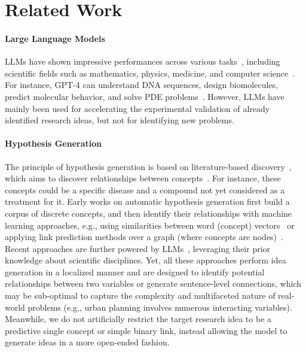 \section{Related Work}
\label{sec:relatedwork}

\paragraph{Large Language Models}
LLMs have shown impressive performances across various tasks~\cite{GPT-4, Gemini}, including scientific fields such as mathematics, physics, medicine, and computer science~\cite{author/discovery, MathematicalLLM, LLM/discovery/2, Airesearchagent, idea/co-creation}. For instance, GPT-4 can understand DNA sequences, design biomolecules, predict molecular behavior, and solve PDE problems~\cite{LLM/discovery/1}. However, LLMs have mainly been used for accelerating the experimental validation of already identified research ideas, but not for identifying new problems. 

\paragraph{Hypothesis Generation}
The principle of hypothesis generation is based on literature-based discovery~\cite{LBD}, which aims to discover relationships between concepts~\cite{Henry2017LiteratureBD}. For instance, these concepts could be a specific disease and a compound not yet considered as a treatment for it. Early works on automatic hypothesis generation first build a corpus of discrete concepts, and then identify their relationships with machine learning approaches, e.g., using similarities between word (concept) vectors~\cite{hypothesis/wordvector} or applying link prediction methods over a graph (where concepts are nodes)~\cite{hypothesis/graph/1, hypothesis/graph/2}. Recent approaches are further powered by LLMs~\cite{CLBD, zeroshot/hypothesis, tomato}, leveraging their prior knowledge about scientific disciplines. Yet, all these approaches perform idea generation in a localized manner and are designed to identify potential relationships between two variables or generate sentence-level connections, which may be sub-optimal to capture the complexity and multifaceted nature of real-world problems (e.g., urban planning involves numerous interacting variables). Meanwhile, we do not artificially restrict the target research idea to be a predictive single concept or simple binary link, instead allowing the model to generate ideas in a more open-ended fashion.

